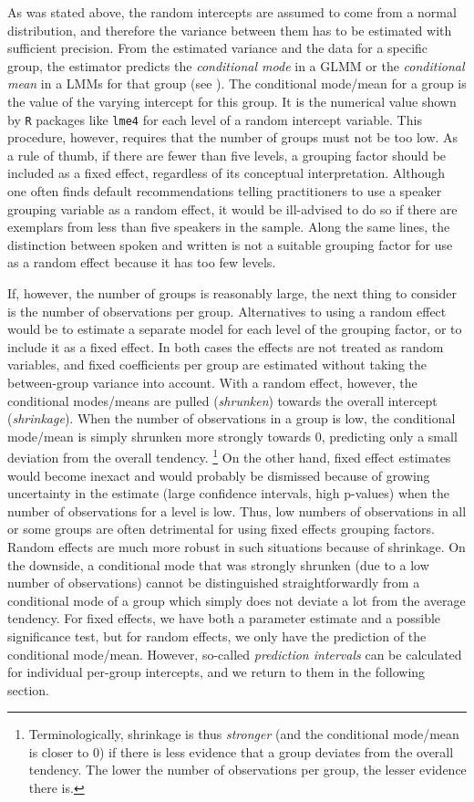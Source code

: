 As was stated above, the random intercepts are assumed to come from a normal distribution, and therefore the variance between them has to be estimated with sufficient precision.
From the estimated variance and the data for a specific group, the estimator predicts the \textit{conditional mode} in a GLMM or the \textit{conditional mean} in a LMMs for that group (see \citealt[Ch.~1]{Bates2010}).
The conditional mode\slash mean for a group is the value of the varying intercept for this group.
It is the numerical value shown by \texttt{R} packages like \texttt{lme4} for each level of a random intercept variable.
This procedure, however, requires that the number of groups must not be too low.
As a rule of thumb, if there are fewer than five levels, a grouping factor should be included as a fixed effect, regardless of its conceptual interpretation.
Although one often finds default recommendations telling practitioners to use a speaker grouping variable as a random effect, it would be ill-advised to do so if there are exemplars from less than five speakers in the sample.
Along the same lines, the distinction between spoken and written is not a suitable grouping factor for use as a random effect because it has too few levels.

If, however, the number of groups is reasonably large, the next thing to consider is the number of observations per group.
Alternatives to using a random effect would be to estimate a separate model for each level of the grouping factor, or to include it as a fixed effect.
In both cases the effects are not treated as random variables, and fixed coefficients per group are estimated without taking the between-group variance into account.
With a random effect, however, the conditional modes\slash means are pulled (\textit{shrunken}) towards the overall intercept (\textit{shrinkage}).
When the number of observations in a group is low, the conditional mode\slash mean is simply shrunken more strongly towards $0$, predicting only a small deviation from the overall tendency.%
\footnote{Terminologically, shrinkage is thus \textit{stronger} (and the conditional mode\slash mean is closer to $0$) if there is less evidence that a group deviates from the overall tendency.
The lower the number of observations per group, the lesser evidence there is.}
On the other hand, fixed effect estimates would become inexact and would probably be dismissed because of growing uncertainty in the estimate (large confidence intervals, high p-values) when the number of observations for a level is low.
Thus, low numbers of observations in all or some groups are often detrimental for using fixed effects grouping factors.
Random effects are much more robust in such situations because of shrinkage.
On the downside, a conditional mode that was strongly shrunken (due to a low number of observations) cannot be distinguished straightforwardly from a conditional mode of a group which simply does not deviate a lot from the average tendency.
For fixed effects, we have both a parameter estimate and a possible significance test, but for random effects, we only have the prediction of the conditional mode\slash mean.
However, so-called \textit{prediction intervals} can be calculated for individual per-group intercepts, and we return to them in the following section.


